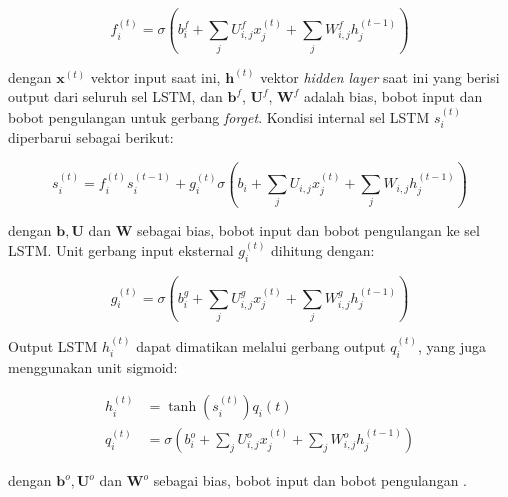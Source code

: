 \begin{equation}
    f_{i}^{(t)} = \sigma\left(b_{i}^{f} + \sum_{j} U_{i,j}^{f} x_{j}^{(t)} + \sum_{j} W_{i,j}^{f} h_{j}^{(t-1)}\right)
\end{equation}

\noindent
dengan $\pmb{x}^{(t)}$ vektor input saat ini, $\pmb{h}^{(t)}$ vektor \textit{hidden layer} saat ini yang berisi output dari seluruh sel LSTM, dan $\pmb{b}^{f}$, $\pmb{U}^{f}$, $\pmb{W}^{f}$ adalah bias, bobot input dan bobot pengulangan untuk gerbang \textit{forget}. Kondisi internal sel LSTM $s_{i}^{(t)}$ diperbarui sebagai berikut:

\begin{equation}
    s_{i}^{(t)} = f_{i}^{(t)}  s_{i}^{(t-1)} + g_{i}^{(t)} \sigma\left(b_{i} + \sum_{j} U_{i,j} x_{j}^{(t)} + \sum_{j} W_{i,j} h_{j}^{(t-1)} \right)
\end{equation}

\noindent
dengan $\pmb{b}, \pmb{U}$ dan $\pmb{W}$ sebagai bias, bobot input dan bobot pengulangan ke sel LSTM\@. Unit gerbang input eksternal $g_{i}^{(t)}$ dihitung dengan:

\begin{equation}
    g_{i}^{(t)} = \sigma\left(b_{i}^{g} + \sum_{j} U_{i,j}^{g} x_{j}^{(t)} + \sum_{j} W_{i,j}^{g} h_{j}^{(t-1)}\right)
\end{equation}

Output LSTM $h_{i}^{(t)}$ dapat dimatikan melalui gerbang output $q_{i}^{(t)}$, yang juga menggunakan unit sigmoid:

\begin{align}
    \label{eq:output-lstm}
    h_{i}^{(t)} &= \tanh\left(s_{i}^{(t)}\right) q_{i}{(t)} \\
    q_{i}^{(t)} &= \sigma\left(b_{i}^{o} + \sum_{j} U_{i,j}^{o} x_{j}^{(t)} + \sum_{j} W_{i,j}^{o} h_{j}^{(t-1)} \right)
\end{align}

\noindent
dengan $\pmb{b}^{o}, \pmb{U}^{o}$ dan $\pmb{W}^{o}$ sebagai bias, bobot input dan bobot pengulangan \citep{goodfellow-2016}.




